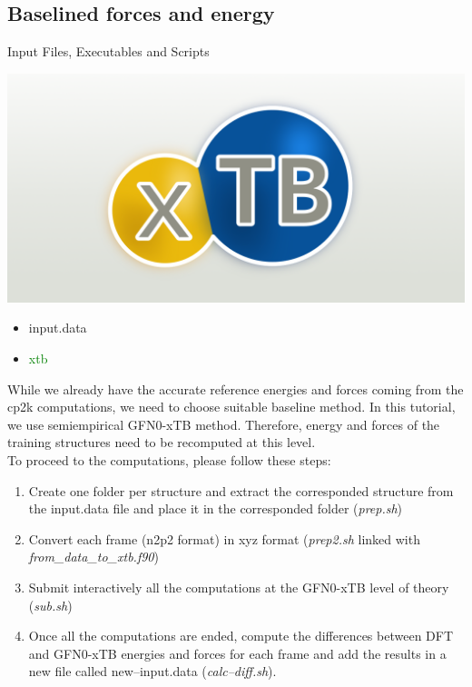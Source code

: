 \documentclass[12pt]{article}
\begin{document}
\subsection{Baselined forces and energy}
\begin{mybox2}{{Input Files, Executables and Scripts}}
\begin{minipage}[c]{0.5\linewidth}
\includegraphics[scale=0.15]{xtb.png}
\end{minipage}
\begin{minipage}[c]{0.5\linewidth}
\begin{itemize}
    \item input.data
    \item \textcolor{green}{xtb}
\end{itemize}
\end{minipage}
\end{mybox2}
While we already have the accurate reference energies and forces coming from the cp2k computations, we need to choose suitable baseline method. In this tutorial, we use semiempirical GFN0-xTB method. Therefore, energy and forces of the training structures need to be recomputed at this level. \\
To proceed to the computations, please follow these steps:
\begin{enumerate}
    \item Create one folder per structure and extract the corresponded structure from the input.data file and place it in the corresponded folder (\textit{prep.sh})
    \item Convert each frame (n2p2 format) in xyz format (\textit{prep2.sh} linked with \textit{from\_data\_to\_xtb.f90})
    \item Submit interactively all the computations at the GFN0-xTB level of theory (\textit{sub.sh})
    \item Once all the computations are ended, compute the differences between DFT and GFN0-xTB energies and forces for each frame and add the results in a new file called new--input.data (\textit{calc--diff.sh}).
\end{enumerate}
\end{document}
